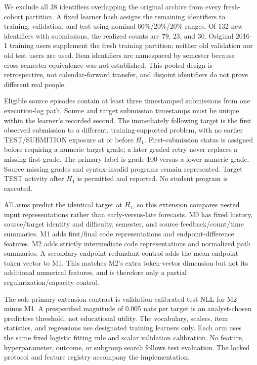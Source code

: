 \documentclass[11pt]{article}
\newcommand{\1}{\mathbb{I}}
\begin{document}
We exclude all 38 identifiers overlapping the original archive from every fresh-cohort partition. A fixed learner hash assigns the remaining identifiers to training, validation, and test using nominal 60\%/20\%/20\% ranges. Of 132 new identifiers with submissions, the realized counts are 79, 23, and 30. Original 2016-1 training users supplement the fresh training partition; neither old validation nor old test users are used. Item identifiers are namespaced by semester because cross-semester equivalence was not established. This pooled design is retrospective, not calendar-forward transfer, and disjoint identifiers do not prove different real people.

Eligible source episodes contain at least three timestamped submissions from one execution-log path. Source and target submission timestamps must be unique within the learner's recorded second. The immediately following target is the first observed submission to a different, training-supported problem, with no earlier TEST/SUBMITION exposure at or before $H_1$. First-submission status is assigned before requiring a numeric target grade; a later graded retry never replaces a missing first grade. The primary label is grade 100 versus a lower numeric grade. Source missing grades and syntax-invalid programs remain represented. Target TEST activity after $H_1$ is permitted and reported. No student program is executed.

All arms predict the identical target at $H_1$, so this extension compares nested input representations rather than early-versus-late forecasts. M0 has fixed history, source/target identity and difficulty, semester, and source feedback/count/time summaries. M1 adds first/final code representations and endpoint-difference features. M2 adds strictly intermediate code representations and normalized path summaries. A secondary endpoint-redundant control adds the mean endpoint token vector to M1. This matches M2's extra token-vector dimension but not its additional numerical features, and is therefore only a partial regularization/capacity control.

The sole primary extension contrast is validation-calibrated test NLL for M2 minus M1. A prespecified magnitude of 0.005 nats per target is an analyst-chosen predictive threshold, not educational utility. The vocabulary, scalers, item statistics, and regressions use designated training learners only. Each arm uses the same fixed logistic fitting rule and scalar validation calibration. No feature, hyperparameter, outcome, or subgroup search follows test evaluation. The locked protocol and feature registry accompany the implementation.
\end{document}
